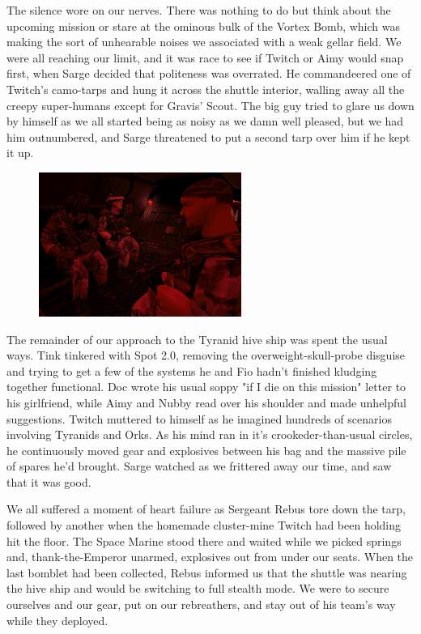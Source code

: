 The silence wore on our nerves. 
There was nothing to do but think about the upcoming mission or stare at the ominous bulk of the Vortex Bomb, which was making the sort of unhearable noises we associated with a weak gellar field. 
We were all reaching our limit, and it was race to see if Twitch or Aimy would snap first, when Sarge decided that politeness was overrated. 
He commandeered one of Twitch's camo-tarps and hung it across the shuttle interior, walling away all the creepy super-humans except for Gravis' Scout. 
The big guy tried to glare us down by himself as we all started being as noisy as we damn well pleased, but we had him outnumbered, and Sarge threatened to put a second tarp over him if he kept it up.

\begin{figure}
	\begin{center}
		\includegraphics[width=\figwidth]{pics/12/28.png}
	\end{center}
\end{figure}
The remainder of our approach to the Tyranid hive ship was spent the usual ways. 
Tink tinkered with Spot 2.0, removing the overweight-skull-probe disguise and trying to get a few of the systems he and Fio hadn't finished kludging together functional. 
Doc wrote his usual soppy "if I die on this mission" letter to his girlfriend, while Aimy and Nubby read over his shoulder and made unhelpful suggestions. 
Twitch muttered to himself as he imagined hundreds of scenarios involving Tyranids and Orks. 
As his mind ran in it's crookeder-than-usual circles, he continuously moved gear and explosives between his bag and the massive pile of spares he'd brought. 
Sarge watched as we frittered away our time, and saw that it was good. 


We all suffered a moment of heart failure as Sergeant Rebus tore down the tarp, followed by another when the homemade cluster-mine Twitch had been holding hit the floor. 
The Space Marine stood there and waited while we picked springs and, thank-the-Emperor unarmed, explosives out from under our seats. 
When the last bomblet had been collected, Rebus informed us that the shuttle was nearing the hive ship and would be switching to full stealth mode. 
We were to secure ourselves and our gear, put on our rebreathers, and stay out of his team's way while they deployed.

